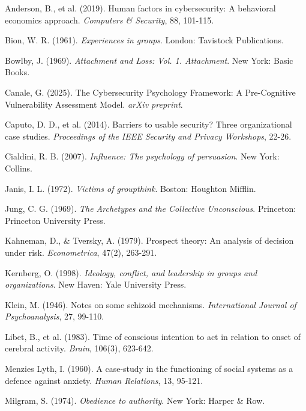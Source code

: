 \documentclass[11pt,a4paper]{article}
\begin{document}
\begin{thebibliography}{99}

Anderson, B., et al. (2019). Human factors in cybersecurity: A behavioral economics approach. \textit{Computers \& Security}, 88, 101-115.

Bion, W. R. (1961). \textit{Experiences in groups}. London: Tavistock Publications.

Bowlby, J. (1969). \textit{Attachment and Loss: Vol. 1. Attachment}. New York: Basic Books.

Canale, G. (2025). The Cybersecurity Psychology Framework: A Pre-Cognitive Vulnerability Assessment Model. \textit{arXiv preprint}.

Caputo, D. D., et al. (2014). Barriers to usable security? Three organizational case studies. \textit{Proceedings of the IEEE Security and Privacy Workshops}, 22-26.

Cialdini, R. B. (2007). \textit{Influence: The psychology of persuasion}. New York: Collins.

Janis, I. L. (1972). \textit{Victims of groupthink}. Boston: Houghton Mifflin.

Jung, C. G. (1969). \textit{The Archetypes and the Collective Unconscious}. Princeton: Princeton University Press.

Kahneman, D., \& Tversky, A. (1979). Prospect theory: An analysis of decision under risk. \textit{Econometrica}, 47(2), 263-291.

Kernberg, O. (1998). \textit{Ideology, conflict, and leadership in groups and organizations}. New Haven: Yale University Press.

Klein, M. (1946). Notes on some schizoid mechanisms. \textit{International Journal of Psychoanalysis}, 27, 99-110.

Libet, B., et al. (1983). Time of conscious intention to act in relation to onset of cerebral activity. \textit{Brain}, 106(3), 623-642.

Menzies Lyth, I. (1960). A case-study in the functioning of social systems as a defence against anxiety. \textit{Human Relations}, 13, 95-121.

Milgram, S. (1974). \textit{Obedience to authority}. New York: Harper \& Row.


\end{thebibliography}
\end{document}
